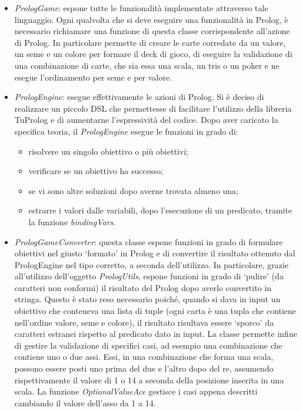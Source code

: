\begin{itemize}
    \item \textit{PrologGame}: espone tutte le funzionalità implementate attraverso tale linguaggio. Ogni qualvolta che si deve eseguire una funzionalità in Prolog, è necessario richiamare una funzione di questa classe corrispondente all’azione di Prolog.
    In particolare permette di creare le carte corredate da un valore, un seme e un colore per formare il deck di gioco, di eseguire la validazione di una combinazione di carte, che sia essa una scala, un tris o un poker e ne esegue l’ordinamento per seme e per valore.

    \item \textit{PrologEngine}: esegue effettivamente le azioni di Prolog.
    Si è deciso di realizzare un piccolo DSL che permettesse di facilitare l’utilizzo della libreria TuProlog e di aumentarne l’espressività del codice. Dopo aver caricato la specifica teoria, il \textit{PrologEngine} esegue le funzioni in grado di:
    \begin{itemize}
        \item risolvere un singolo obiettivo o più obiettivi;
        \item verificare se un obiettivo ha successo;
        \item se vi sono altre soluzioni dopo averne trovata almeno una;
        \item estrarre i valori dalle variabili, dopo l’esecuzione di un predicato, tramite la funzione \textit{bindingVars}.
    \end{itemize}

    \item \textit{PrologGameConverter}: questa classe espone funzioni in grado di formulare obiettivi nel giusto ‘formato’ in Prolog e di convertire il risultato ottenuto dal PrologEngine nel tipo corretto, a seconda dell’utilizzo. In particolare, grazie all’utilizzo dell’oggetto \textit{PrologUtils}, espone funzioni in grado di ‘pulire’ (da caratteri non conformi) il risultato del Prolog dopo averlo convertito in stringa. Questo è stato reso necessario poiché, quando si dava in input un obiettivo che conteneva una lista di tuple (ogni carta è una tupla che contiene nell’ordine valore, seme e colore), il risultato risultava essere ‘sporco’ da caratteri estranei rispetto al predicato dato in input.
    La classe permette infine di gestire la validazione di specifici casi, ad esempio  una combinazione che contiene uno o due assi. Essi, in una combinazione che forma una scala, possono essere posti uno prima del due e l’altro dopo del re, assumendo rispettivamente il valore di 1 o 14 a seconda della posizione inserita in una scala. La funzione \textit{OptionalValueAce} gestisce i casi appena descritti cambiando il valore dell’asso da 1 a 14.
\end{itemize}

